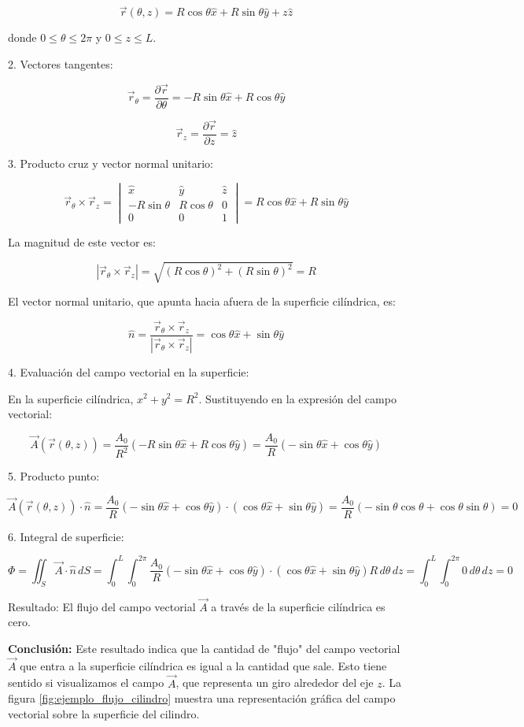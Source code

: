 \documentclass{article}
\begin{document}
\[
\vec{r}(\theta, z) = R\cos\theta\hat{x} + R\sin\theta\hat{y} + z\hat{z}
\]

donde $0 \le \theta \le 2\pi$ y $0 \le z \le L$.

2. Vectores tangentes:

\[
\vec{r}_\theta = \frac{\partial \vec{r}}{\partial \theta} = -R\sin\theta\hat{x} + R\cos\theta\hat{y}
\]

\[
\vec{r}_z = \frac{\partial \vec{r}}{\partial z} = \hat{z}
\]

3. Producto cruz y vector normal unitario:

\[
\vec{r}_\theta \times \vec{r}_z = \begin{vmatrix}
\hat{x} & \hat{y} & \hat{z} \\
-R\sin\theta & R\cos\theta & 0 \\
0 & 0 & 1
\end{vmatrix} = R\cos\theta\hat{x} + R\sin\theta\hat{y}
\]

La magnitud de este vector es:

\[
|\vec{r}_\theta \times \vec{r}_z| = \sqrt{(R\cos\theta)^2 + (R\sin\theta)^2} = R
\]

El vector normal unitario, que apunta hacia afuera de la superficie cilíndrica, es:

\[
\hat{n} = \frac{\vec{r}_\theta \times \vec{r}_z}{|\vec{r}_\theta \times \vec{r}_z|} = \cos\theta\hat{x} + \sin\theta\hat{y}
\]

4. Evaluación del campo vectorial en la superficie:

En la superficie cilíndrica, $x^2 + y^2 = R^2$. Sustituyendo en la expresión del campo vectorial:

\[
\vec{A}(\vec{r}(\theta, z)) = \frac{A_0}{R^2}(-R\sin\theta\hat{x} + R\cos\theta\hat{y}) = \frac{A_0}{R}(-\sin\theta\hat{x} + \cos\theta\hat{y})
\]

5. Producto punto:

\[
\vec{A}(\vec{r}(\theta,z)) \cdot \hat{n} = \frac{A_0}{R}(-\sin\theta\hat{x} + \cos\theta\hat{y}) \cdot (\cos\theta\hat{x} + \sin\theta\hat{y}) = \frac{A_0}{R}(-\sin\theta\cos\theta + \cos\theta\sin\theta) = 0
\]

6. Integral de superficie:

\[
\Phi = \iint_S \vec{A} \cdot \hat{n} \, dS = \int_0^L \int_0^{2\pi} \frac{A_0}{R}(-\sin\theta\hat{x} + \cos\theta\hat{y}) \cdot (\cos\theta\hat{x} + \sin\theta\hat{y}) R \, d\theta \, dz = \int_0^L \int_0^{2\pi} 0 \, d\theta \, dz = 0
\]

Resultado: El flujo del campo vectorial $\vec{A}$ a través de la superficie cilíndrica es cero.



\textbf{Conclusión:} Este resultado indica que la cantidad de "flujo" del campo vectorial $\vec{A}$ que entra a la superficie cilíndrica es igual a la cantidad que sale. Esto tiene sentido si visualizamos el campo $\vec{A}$, que representa un giro alrededor del eje $z$. La figura \ref{fig:ejemplo_flujo_cilindro} muestra una representación gráfica del campo vectorial sobre la superficie del cilindro.
    
\end{document}
